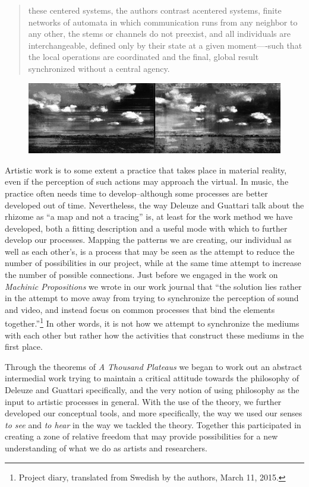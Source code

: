 \documentclass[11pt]{article}
\begin{document}
\begin{quote}
  these centered systems, the authors contrast acentered systems,
  finite networks of automata in which communication runs from any
  neighbor to any other, the stems or channels do not preexist, and
  all individuals are interchangeable, defined only by their state at
  a given moment—-such that the local operations are coordinated and
  the final, global result synchronized without a central
  agency. \citep[p. 19]{deleuze80}
\end{quote}

\begin{figure}\label{fig:impro-1}
  \centering
  \includegraphics[width=\linewidth]{img/final/Mongrel_landskab_2pr_row_ELISK_monoC}
\end{figure}

Artistic work is to some extent a practice that takes
place in material reality, even if the perception of such actions may
approach the virtual. In music, the
practice often needs time to develop--although some processes are
better developed out of time. Nevertheless, the way Deleuze and
Guattari talk about the rhizome as ``a map and not a tracing''
\citep[p. 13]{deleuze80} is, at least for the work method we have
developed, both a fitting description and a useful mode with which to further
develop our processes. Mapping the patterns we are creating, our
individual as well as each other's, is a process that may be
seen as the attempt to reduce the number of possibilities in our
project, while at the same time attempt to increase the number of
possible connections. Just
before we engaged in the work on \emph{Machinic Propositions} we wrote
in our work journal that ``the solution lies rather in the attempt to
move away from trying to synchronize the perception of sound and
video, and instead focus on common processes that bind the elements
together.''\footnote{Project diary, translated from Swedish by the
  authors, March 11, 2015. } In other words, it is not how we attempt
to synchronize the mediums with each other but rather how the
activities that construct these mediums in the first place.

Through the theorems of \emph{A Thousand Plateaus} we began to work
out an abstract intermedial work trying to maintain a critical
attitude towards the philosophy of Deleuze and Guattari specifically,
and the very notion of using philosophy as the input to artistic
processes in general. With the use of the theory, we further developed our
conceptual tools, and more specifically, the way we used our senses
\emph{to see} and \emph{to hear} in the way we tackled the theory.
Together this participated in creating a zone of relative freedom that may provide
possibilities for a new understanding of what we do as artists and
researchers.
\end{document}
